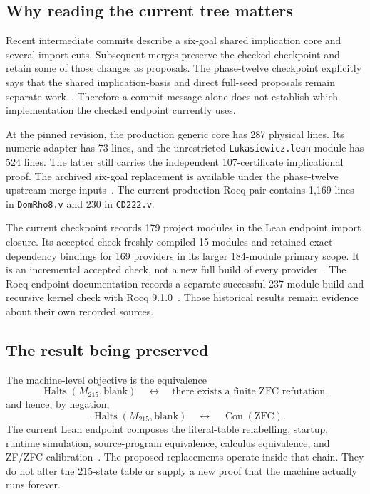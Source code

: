 \documentclass[11pt]{article}
\newcommand{\Halts}{\operatorname{Halts}}
\newcommand{\Con}{\operatorname{Con}}
\begin{document}
\subsection{Why reading the current tree matters}

Recent intermediate commits describe a six-goal shared implication core and several import cuts. Subsequent merges preserve the checked checkpoint and retain some of those changes as proposals. The phase-twelve checkpoint explicitly says that the shared implication-basis and direct full-seed proposals remain separate work~\cite{phase12}. Therefore a commit message alone does not establish which implementation the checked endpoint currently uses.

At the pinned revision, the production generic core has 287 physical lines. Its numeric adapter has 73 lines, and the unrestricted \texttt{Lukasiewicz.lean} module has 524 lines. The latter still carries the independent 107-certificate implicational proof. The archived six-goal replacement is available under the phase-twelve upstream-merge inputs~\cite{archivedcore}. The current production Rocq pair contains 1,169 lines in \texttt{DomRho8.v} and 230 in \texttt{CD222.v}.

The current checkpoint records 179 project modules in the Lean endpoint import closure. Its accepted check freshly compiled 15 modules and retained exact dependency bindings for 169 providers in its larger 184-module primary scope. It is an incremental accepted check, not a new full build of every provider~\cite{phase12}. The Rocq endpoint documentation records a separate successful 237-module build and recursive kernel check with Rocq 9.1.0~\cite{rocqstatus}. Those historical results remain evidence about their own recorded sources.

\subsection{The result being preserved}

The machine-level objective is the equivalence
\[
  \Halts(M_{215},\mathrm{blank})
  \quad\longleftrightarrow\quad
  \text{there exists a finite ZFC refutation},
\]
and hence, by negation,
\[
  \neg\Halts(M_{215},\mathrm{blank})\quad\longleftrightarrow\quad\Con(\mathrm{ZFC}).
\]
The current Lean endpoint composes the literal-table relabelling, startup, runtime simulation, source-program equivalence, calculus equivalence, and ZF/ZFC calibration~\cite{endpoint}. The proposed replacements operate inside that chain. They do not alter the 215-state table or supply a new proof that the machine actually runs forever.
\end{document}
